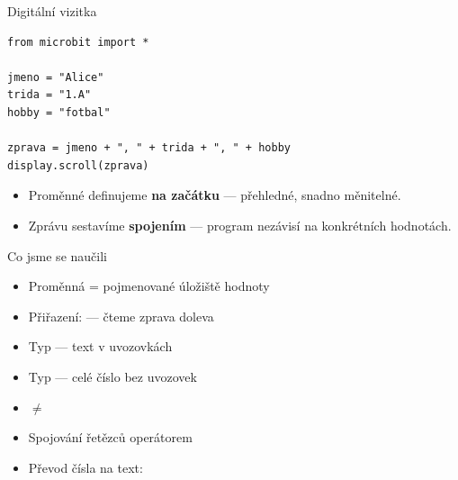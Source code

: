 \begin{frame}[fragile]{Digitální vizitka}

  \begin{lstlisting}
from microbit import *

jmeno = "Alice"
trida = "1.A"
hobby = "fotbal"

zprava = jmeno + ", " + trida + ", " + hobby
display.scroll(zprava)
  \end{lstlisting}

  \bigskip
  \begin{itemize}
    \item Proměnné definujeme \textbf{na začátku} — přehledné, snadno měnitelné.
    \item Zprávu sestavíme \textbf{spojením} — program nezávisí na konkrétních hodnotách.
  \end{itemize}
\end{frame}

\begin{frame}{Co jsme se naučili}
  \begin{itemize}
    \item[\checkmark] Proměnná = pojmenované úložiště hodnoty
    \item[\checkmark] Přiřazení:  — čteme zprava doleva
    \item[\checkmark] Typ  — text v uvozovkách
    \item[\checkmark] Typ  — celé číslo bez uvozovek
    \item[\checkmark]  $\neq$ 
    \item[\checkmark] Spojování řetězců operátorem \pyinline{+}
    \item[\checkmark] Převod čísla na text: 
  \end{itemize}
\end{frame}



